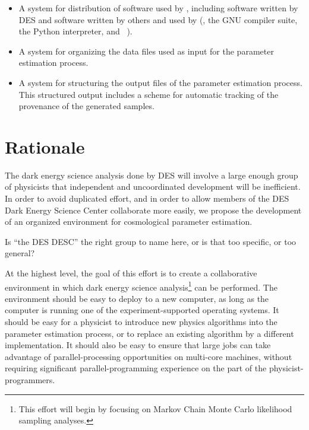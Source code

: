 \documentclass[draftmode,draftwater]{memarticle}
\newcommand{\cosmosis}{\name{CosmoSIS}\xspace}
\begin{document}
\begin{itemize}
\item A system for distribution of software used by \cosmosis, including
  software written by DES and software written by others and used by
  \cosmosis (\eg, the GNU compiler suite, the Python interpreter, and
  ~\cite{numpy}).

\item A system for organizing the data files used as input for the
  parameter estimation process.

\item A system for structuring the output files of the parameter
  estimation process. This structured output includes a scheme for
  automatic tracking of the provenance of the generated samples.

\end{itemize}


\section{Rationale\label{sec:rationale}}

The dark energy science analysis done by DES will involve a large enough
group of physicists
that independent and uncoordinated development will be inefficient. In order to
avoid duplicated effort, and in order to allow members of the
DES Dark Energy Science Center collaborate more easily, we propose the
development of an organized environment for cosmological parameter
estimation.
\begin{fixme}
  Is ``the DES DESC'' the right group to name here, or is that too
  specific, or too general?
\end{fixme}

At the highest level, the goal of this effort is to create a
collaborative environment in which dark energy science
analysis\footnote{This effort will begin by focusing on Markov Chain
  Monte Carlo likelihood sampling analyses.} can
be performed. The environment should be easy to deploy to a new computer,
as long as the computer is running one of the experiment-supported
operating systems. It should be easy for a physicist to introduce new
physics algorithms into the parameter estimation process, or to
replace an existing algorithm by a different implementation. It should
also be easy to ensure that large jobs can take advantage of
parallel-processing opportunities on multi-core machines, without
requiring significant parallel-programming experience on the part of
the physicist-programmers.
\end{document}
